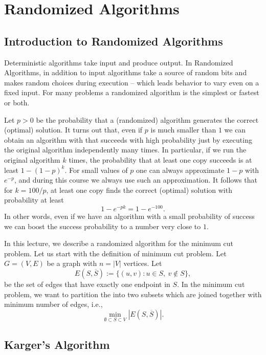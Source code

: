 % 

\chapter{Randomized Algorithms}

\section{Introduction to Randomized Algorithms}

Deterministic algorithms take input and produce output. In Randomized Algorithms, in addition to input algorithms take a source of random bits and makes random choices during execution -- which leads behavior to vary even on a fixed input. For many problems a randomized algorithm is the simplest or fastest or both.

Let $p>0$ be the probability that a (randomized) algorithm generates the correct (optimal) solution. It turns out that, even if $p$ is much smaller than $1$ we can obtain an algorithm with that succeeds with high probability just by executing the original algorithm independently many times. In particular, if we run the original algorithm $k$ times, the probability that at least one copy succeeds is at least $1-(1-p)^k$. For small values of $p$ one can always approximate $1-p$ with $e^{-p}$, and during this course we always use such an approximation. It follows that for $k=100/p$, at least one copy finds the correct (optimal) solution with probability at least
\[
  1-e^{-pk}=1-e^{-100}.
\]
In other words, even if we have an algorithm with a small probability of success we can boost the success probability to a number very close to $1$.

In this lecture, we describe a randomized algorithm for the minimum cut problem. Let us start with the definition of minimum cut problem. Let $G=(V,E)$ be a graph with $n=|V|$ vertices. Let
\[
  E(S,\overline{S}):=\{(u,v):u\in S,\ v\notin S\},
\]
be the set of edges that have exactly one endpoint in $S$. In the minimum cut problem, we want to partition the into two subsets which are joined together with minimum number of edges, i.e.,
\[
  \min_{\emptyset\subset S\subset V}|E(S,\overline{S})|.
\]

\section{Karger's Algorithm}

